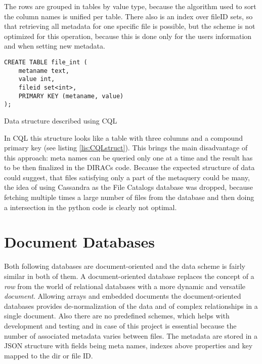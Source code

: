 The rows are grouped in tables by value type, because the algorithm used to sort the
column names is unified per table. There also is an index over fileID sets, 
so that retrieving all metadata for one specific file is possible, but the scheme is 
not optimized for this operation, because this is done only for the users information and
when setting new metadata.

\begin{listing}
\begin{verbatim}
CREATE TABLE file_int (
    metaname text,
    value int,
    fileid set<int>,
    PRIMARY KEY (metaname, value)
);
\end{verbatim}
\caption{Data structure described using CQL}
\label{lis:CQLstruct}
\end{listing}

In CQL this structure looks like a table with three columns and a compound primary key (see listing 
\ref{lis:CQLstruct}). 
This brings the main disadvantage of this approach: meta names can be queried only one at a time and
the result has to be then finalized in the DIRACs code. Because the expected structure of data could
suggest, that files satisfying only a part of the metaquery could be many, the idea of using 
Cassandra as the File Catalogs database was dropped, because fetching multiple times a large number of 
files from the database and then doing a intersection in the python code is clearly not optimal. 



\section{Document Databases}

Both following databases are document-oriented and the data scheme is fairly similar in both
of them. A document-oriented database replaces the concept of a \textit{row} from the world of relational 
databases with a more dynamic and versatile \textit{document}. Allowing arrays and embedded documents the 
document-oriented databases provides de-normalization of the data and  of complex 
relationships in a single document. Also there are no predefined schemes, which helps with development 
and testing and in case of this project is essential because the number of associated metadata varies between 
files. The metadata are stored in a JSON structure with fields being meta names, indexes above properties and key 
mapped to the dir or file ID.


